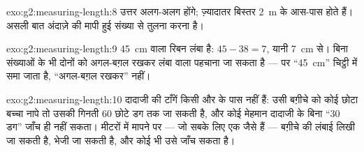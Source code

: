 \begin{solution}{exo:g2:measuring-length:8}
उत्तर अलग-अलग होंगे; ज़्यादातर बिस्तर \qty{2}{m} के आस-पास होते हैं।
असली बात अंदाज़े की मापी हुई संख्या से तुलना करना है।
\end{solution}

\begin{solution}{exo:g2:measuring-length:9}
\qty{45}{cm} वाला रिबन लंबा है: $45 - 38 = 7$, यानी \qty{7}{cm} से।
बिना संख्याओं के भी दोनों को अगल-बग़ल रखकर लंबा वाला पहचाना जा सकता
है --- पर ``\qty{45}{cm}'' चिट्ठी में समा जाता है, ``अगल-बग़ल रखकर''
नहीं।
\end{solution}

\begin{solution}{exo:g2:measuring-length:10}
दादाजी की टाँगें किसी और के पास नहीं हैं: उसी बग़ीचे को कोई छोटा
बच्चा नापे तो उसकी गिनती $60$ छोटे डग तक जा सकती है, और कोई मेहमान
दादाजी के बिना ``$30$ डग'' जाँच ही नहीं सकता। मीटरों में मापने पर ---
जो सबके लिए एक जैसे हैं --- बग़ीचे की लंबाई लिखी जा सकती है, भेजी जा
सकती है, और कोई भी उसे जाँच सकता है।
\end{solution}
